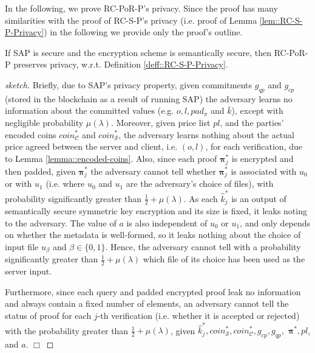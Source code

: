 In the following, we prove  RC-PoR-P's privacy. Since the  proof has many similarities with  the  proof of RC-S-P's privacy (i.e. proof of Lemma \ref{lem::RC-S-P-Privacy}) in the following we provide only the proof's outline.  



\begin{lemma}\label{lemma::RC-PoR-P-privacy} If SAP is secure and the encryption scheme is semantically secure, then RC-PoR-P preserves privacy, w.r.t. Definition \ref{deff::RC-S-P-Privacy}. 
\end{lemma}

\begin{proof}[sketch] Briefly, due to SAP's privacy property, given  commitments $g_{\scriptscriptstyle qp}$ and $g_{\scriptscriptstyle cp}$ (stored in the blockchain as a result of running SAP) the adversary learns no information about the committed values (e.g. $o, l, pad_{\scriptscriptstyle\pi}$ and $\bar{k}$), except with negligible probability $\mu(\lambda)$. Moreover, given  price list $pl$, and the parties' encoded coins $coin^{\scriptscriptstyle *}_{\scriptscriptstyle\mathcal{C}}$ and  $coin^{\scriptscriptstyle *}_{\scriptscriptstyle\mathcal{S}}$, the adversary learns nothing about the actual price agreed between the server and client, i.e. $(o,l)$, for each verification, due to Lemma \ref{lemma::encoded-coins}.  Also, since each proof $\bm{\pi}^{\scriptscriptstyle *}_{\scriptscriptstyle j}$ is encrypted and then padded, given $\bm{\pi}^{\scriptscriptstyle *}_{\scriptscriptstyle j}$ the adversary cannot tell  whether $\bm{\pi}^{\scriptscriptstyle *}_{\scriptscriptstyle j}$ is associated with $u_{\scriptscriptstyle 0}$ or with $u_{\scriptscriptstyle 1}$ (i.e. where $u_{\scriptscriptstyle 0}$ and $u_{\scriptscriptstyle 1}$ are the adversary's choice of files), with probability significantly greater than $\frac{1}{2}+\mu(\lambda)$. As each $\hat{k}^{\scriptscriptstyle *}_{\scriptscriptstyle j}$ is an output of semantically secure symmetric key encryption and its size is fixed, it  leaks noting to the adversary.  The value of $a$ is also independent of $u_{\scriptscriptstyle 0}$  or $u_{\scriptscriptstyle 1}$, and only depends on whether the metadata is well-formed, so it leaks nothing about the choice of  input file $u_{\scriptscriptstyle\beta}$ and $\beta\in\{0,1\}$. Hence, the adversary cannot tell with a probability significantly greater than $\frac{1}{2}+\mu(\lambda)$ which file of its choice has been used as the server input. 

Furthermore, since each query and padded encrypted proof leak no information and always contain a fixed number of elements, an adversary cannot tell the status of  proof for each $j$-th verification (i.e. whether it is accepted or rejected) with the probability greater than $\frac{1}{2}+\mu(\lambda)$, given  $\hat{k}^{\scriptscriptstyle *}_{\scriptscriptstyle j},coin^{\scriptscriptstyle *}_{\scriptscriptstyle \mathcal S},coin^{\scriptscriptstyle *}_{\scriptscriptstyle\mathcal C}, g_{\scriptscriptstyle cp},  g_{\scriptscriptstyle qp},$  $\bm{\pi}^{\scriptscriptstyle *},pl$, and $a$.
  \hfill\(\Box\)\end{proof}


